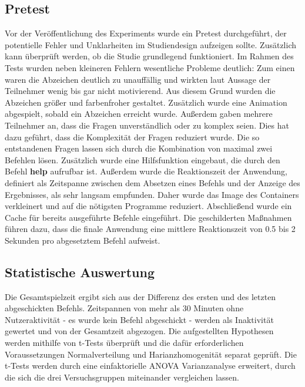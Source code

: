 \subsection{Pretest}\label{verlauf}
Vor der Veröffentlichung des Experiments wurde ein Pretest durchgeführt, der potentielle Fehler und Unklarheiten im Studiendesign aufzeigen sollte. Zusätzlich kann überprüft werden, ob die Studie grundlegend funktioniert. Im Rahmen des Tests wurden neben kleineren Fehlern wesentliche Probleme deutlich: Zum einen waren die Abzeichen deutlich zu unauffällig und wirkten laut Aussage der Teilnehmer wenig bis gar nicht motivierend. Aus diesem Grund wurden die Abzeichen größer und farbenfroher gestaltet. Zusätzlich wurde eine Animation abgespielt, sobald ein Abzeichen erreicht wurde. Außerdem gaben mehrere Teilnehmer an, dass die Fragen unverständlich oder zu komplex seien. Dies hat dazu geführt, dass die Komplexität der Fragen reduziert wurde. Die so entstandenen Fragen lassen sich durch die Kombination von maximal zwei Befehlen lösen. Zusätzlich wurde eine Hilfsfunktion eingebaut, die durch den Befehl \textbf{help} aufrufbar ist. Außerdem wurde die Reaktionszeit der Anwendung, definiert als Zeitspanne zwischen dem Absetzen eines Befehls und der Anzeige des Ergebnisses, als sehr langsam empfunden. Daher wurde das Image des Containers verkleinert und auf die nötigsten Programme reduziert. Abschließend wurde ein Cache für bereits ausgeführte Befehle eingeführt. Die geschilderten Maßnahmen führen dazu, dass die finale Anwendung eine mittlere Reaktionszeit von 0.5 bis 2 Sekunden pro abgesetztem Befehl aufweist.


\subsection{Statistische Auswertung}
Die Gesamtspielzeit ergibt sich aus der Differenz des ersten und des letzten abgeschickten Befehls. Zeitspannen von mehr als 30 Minuten ohne Nutzeraktivität - es wurde kein Befehl abgeschickt - werden als Inaktivität gewertet und von der Gesamtzeit abgezogen. Die aufgestellten Hypothesen werden mithilfe von t-Tests überprüft und die dafür erforderlichen Voraussetzungen Normalverteilung und Harianzhomogenität separat geprüft. Die t-Tests werden durch eine einfaktorielle ANOVA Varianzanalyse erweitert, durch die sich die drei Versuchsgruppen miteinander vergleichen lassen.